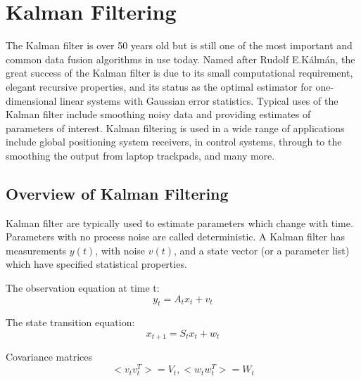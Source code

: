 \chapter{Kalman Filtering}
\label{ch:kalman_filter}
%
%
\begin{fullwidth}


The Kalman filter is over 50 years old but is still one of the most important and common data fusion algorithms in use today. 
Named after Rudolf E.Kálmán, the great success of the Kalman filter is due to its small computational requirement, elegant recursive properties, and its status as the optimal estimator for one-dimensional linear systems with Gaussian error statistics. 
Typical uses of the Kalman filter include smoothing noisy data and providing estimates of parameters of interest. 
Kalman filtering is used in a wide range of applications include global positioning system receivers, in control systems, through to the smoothing the output from laptop trackpads, and many more.
%
\end{fullwidth}

\section{Overview of Kalman Filtering}

Kalman filter are typically used to estimate parameters which change with time. 
Parameters with no process noise are called deterministic.
A Kalman filter has measurements $y(t)$, with noise $v(t)$, and a state vector (or a parameter list) which have specified statistical properties.

The observation equation at time t:
\begin{equation}
    y_t = A_t x_t + v_t
\end{equation}

The state transition equation:
\begin{equation}
    x_{t+1} = S_t x_t + w_t
\end{equation}

Covariance matrices
\begin{equation}
    <v_tv_t^T> = V_t , <w_tw_t^T> = W_t 
\end{equation}


